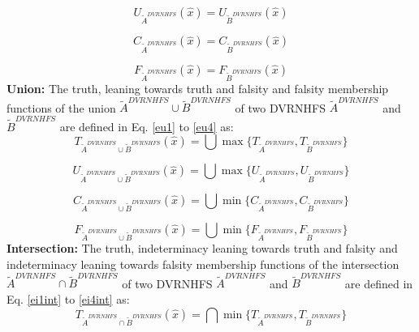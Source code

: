 \documentclass[a4paper]{elsarticle}
\begin{document}
{\begin{equation}
\label{eq2}
{U_{\tilde{A}^{DVRNHFS}}}(\hat{x}) = {U_{\tilde{B}^{DVRNHFS}}}(\hat{x})
\end{equation}

\begin{equation}
\label{eq3}
{C_{\tilde{A}^{DVRNHFS}}}(\hat{x}) = {C_{\tilde{B}^{DVRNHFS}}}(\hat{x})
\end{equation}

\begin{equation}
\label{eq4}
{F_{\tilde{A}^{DVRNHFS}}}(\hat{x}) = {F_{\tilde{B}^{DVRNHFS}}}(\hat{x})
\end{equation}
\textbf{Union:}
The truth, leaning towards truth and falsity and falsity membership functions of the union $\tilde{A}^{DVRNHFS}\cup \tilde{B}^{DVRNHFS}$ of two DVRNHFS $\tilde{A}^{DVRNHFS}$ and $\tilde{B}^{DVRNHFS}$ are defined in Eq. \ref{eu1} to \ref{eu4}  as:
\begin{equation}
\label{eu1}
T_{\tilde{A}^{DVRNHFS}\cup \tilde{B}^{DVRNHFS}}(\hat{x}) = \bigcup \max\{T_{\tilde{A}^{DVRNHFS}},T_{\tilde{B}^{DVRNHFS}}\}
\end{equation}

\begin{equation}
\label{eu2}
U_{\tilde{A}^{DVRNHFS}\cup \tilde{B}^{DVRNHFS}}(\hat{x}) = \bigcup \max\{U_{\tilde{A}^{DVRNHFS}},U_{\tilde{B}^{DVRNHFS}}\}
\end{equation}

\begin{equation}
\label{eu3}
C_{\tilde{A}^{DVRNHFS}\cup \tilde{B}^{DVRNHFS}}(\hat{x}) = \bigcup \min\{C_{\tilde{A}^{DVRNHFS}},C_{\tilde{B}^{DVRNHFS}}\}
\end{equation}

\begin{equation}
\label{eu4}
F_{\tilde{A}^{DVRNHFS}\cup \tilde{B}^{DVRNHFS}}(\hat{x}) = \bigcup \min\{F_{\tilde{A}^{DVRNHFS}},F_{\tilde{B}^{DVRNHFS}}\}
\end{equation}
\textbf{Intersection:}
The truth, indeterminacy leaning towards truth and falsity and indeterminacy leaning towards falsity membership functions of the intersection $\tilde{A}^{DVRNHFS}\cap \tilde{B}^{DVRNHFS}$ of two DVRNHFS $\tilde{A}^{DVRNHFS}$ and $\tilde{B}^{DVRNHFS}$ are defined in Eq. \ref{ei1int} to \ref{ei4int} as:
\begin{equation}
\label{ei1int}
T_{\tilde{A}^{DVRNHFS}\cap \tilde{B}^{DVRNHFS}}(\hat{x}) = \bigcap \min\{T_{\tilde{A}^{DVRNHFS}},T_{\tilde{B}^{DVRNHFS}}\}
\end{equation}

}
\end{document}
